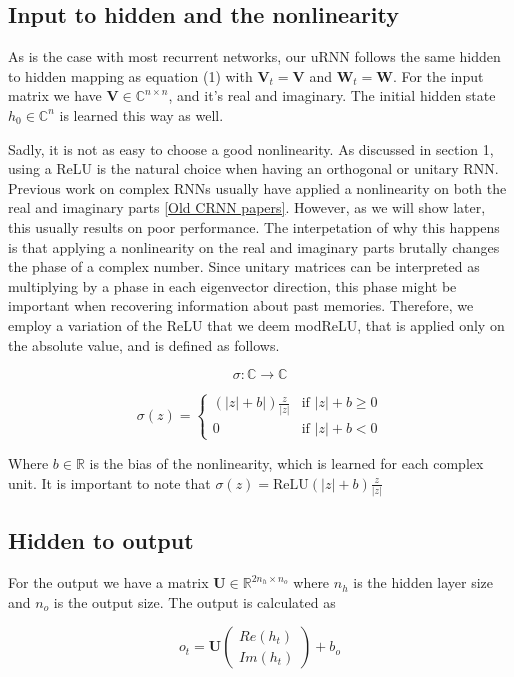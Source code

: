 \documentclass{article} %
\newcommand{\matr}[1]{\mathbf{#1}}
\newcommand\RR{\mathbb{R}}
\newcommand\CC{\mathbb{C}}
\begin{document}
\subsection{Input to hidden and the nonlinearity}

As is the case with most recurrent networks, our uRNN follows the same hidden to hidden mapping as equation (1) with $\matr{V}_t = \matr{V}$ and $\matr{W}_t = \matr{W}$. For the input matrix we have $\matr{V} \in \CC^{n \times n}$, and it's real and imaginary. The initial hidden state $h_0 \in \CC^n$ is learned this way as well.

Sadly, it is not as easy to choose a good nonlinearity. As discussed in section 1, using a ReLU is the natural choice when having an orthogonal or unitary RNN. Previous work on complex RNNs usually have applied a nonlinearity on both the real and imaginary parts \ref{Old CRNN papers}. However, as we will show later, this usually results on poor performance. The interpetation of why this happens is that applying a nonlinearity on the real and imaginary parts brutally changes the phase of a complex number. Since unitary matrices can be interpreted as multiplying by a phase in each eigenvector direction, this phase might be important when recovering information about past memories. Therefore, we employ a variation of the ReLU that we deem modReLU, that is applied only on the absolute value, and is defined as follows.

$$ \sigma: \CC \rightarrow \CC $$

$$ \sigma (z) = 
\left\{
  \begin{array}{ll}
    (|z|+b|) \frac{z}{|z|}  & \mbox{if } |z| + b \geq 0 \\
    0 & \mbox{if } |z| + b < 0
  \end{array}
\right.
$$


Where $b \in \RR$ is the bias of the nonlinearity, which is learned for each complex unit. It is important to note that $\sigma(z) = \text{ReLU}(|z| + b) \frac{z}{|z|}$

\subsection{Hidden to output}

For the output we have a matrix $\matr{U} \in \RR^{2n_h \times n_o}$ where $n_h$ is the hidden layer size and $n_o$ is the output size. The output is calculated as

$$ o_t = \matr{U} \begin{pmatrix} Re(h_t) \\ Im(h_t) \end{pmatrix} + b_o $$
\end{document}
